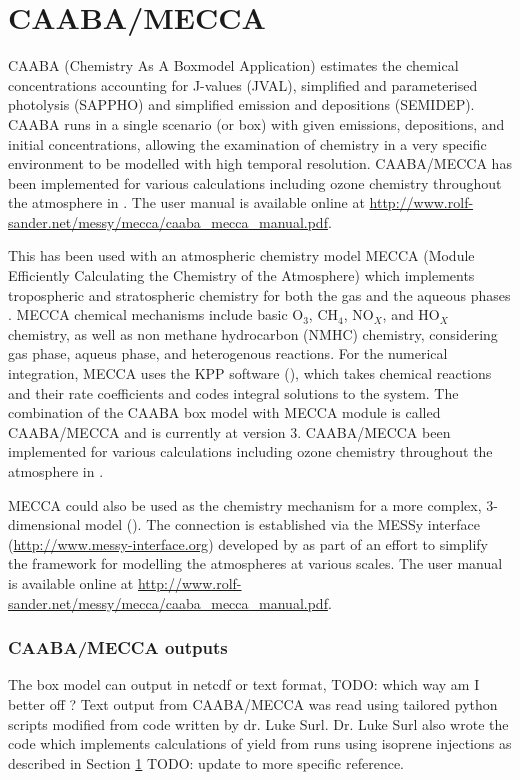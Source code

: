   
\section{CAABA/MECCA}
  \label{Model:CM}
  
  
  CAABA (Chemistry As A Boxmodel Application) estimates the chemical concentrations accounting for J-values (JVAL), simplified and parameterised photolysis (SAPPHO) and simplified emission and depositions (SEMIDEP).
  CAABA runs in a single scenario (or box) with given emissions, depositions, and initial concentrations, allowing the examination of chemistry in a very specific environment to be modelled with high temporal resolution.
  CAABA/MECCA has been implemented for various calculations including ozone chemistry throughout the atmosphere in \cite{Zanis2014}.
  The user manual is available online at \url{http://www.rolf-sander.net/messy/mecca/caaba_mecca_manual.pdf}.
  
  This has been used with an atmospheric chemistry model MECCA (Module Efficiently Calculating the Chemistry of the Atmosphere) which implements tropospheric and stratospheric chemistry for both the gas and the aqueous phases \parencite{Sander2005}.
  MECCA chemical mechanisms include basic O$_3$, CH$_4$, NO$_X$, and HO$_X$ chemistry, as well as non methane hydrocarbon (NMHC) chemistry, considering gas phase, aqueus phase, and heterogenous reactions. \parencite{Sander2005}
  For the numerical integration, MECCA uses the KPP software (\cite{SanduSander2006}), which takes chemical reactions and their rate coefficients and codes integral solutions to the system.
  The combination of the CAABA box model with MECCA module is called CAABA/MECCA and is currently at version 3.
  CAABA/MECCA been implemented for various calculations including ozone chemistry throughout the atmosphere in \cite{Zanis2014}.
  
  MECCA could also be used as the chemistry mechanism for a more complex, 3-dimensional model (\cite[e.g.][]{Jockel2006}).
  The connection is established via the MESSy interface (\url{http://www.messy-interface.org}) developed by \cite{Jockel2005} as part of an effort to simplify the framework for modelling the atmospheres at various scales.
  The user manual is available online at \url{http://www.rolf-sander.net/messy/mecca/caaba_mecca_manual.pdf}.
  
  \subsubsection{CAABA/MECCA outputs}
  The box model can output in netcdf or text format, TODO: which way am I better off ? 
  Text output from CAABA/MECCA was read using tailored python scripts modified from code written by dr. Luke Surl.
  Dr. Luke Surl also wrote the code which implements calculations of yield from runs using isoprene injections as described in Section \ref{Model:CM} TODO: update to more specific reference.
  
